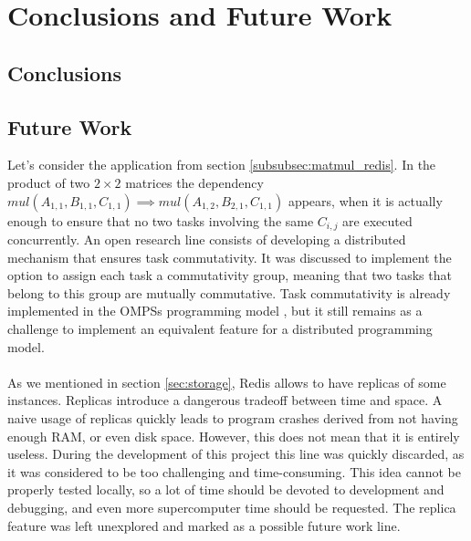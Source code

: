\section{Conclusions and Future Work}
\subsection{Conclusions}
\label{subsec:conclusions}


\subsection{Future Work}
\label{subsec:future_work}

Let's consider the application from section \ref{subsubsec:matmul_redis}. In the product of two $2 \times 2$ matrices the dependency $mul(A_{1, 1}, B_{1, 1}, C_{1, 1}) \implies mul(A_{1,2}, B_{2, 1}, C_{1, 1})$ appears, when it is actually enough to ensure that no two tasks involving the same $C_{i, j}$ are executed concurrently. An open research line consists of developing a distributed mechanism that ensures task commutativity. It was discussed to implement the option to assign each task a commutativity group, meaning that two tasks that belong to this group are mutually commutative. Task commutativity is already implemented in the OMPSs programming model \cite{duran2011ompss}, but it still remains as a challenge to implement an equivalent feature for a distributed programming model.\\
\\
As we mentioned in section \ref{sec:storage}, Redis allows to have replicas of some instances. Replicas introduce a dangerous tradeoff between time and space. A naive usage of replicas quickly leads to program crashes derived from not having enough RAM, or even disk space. However, this does not mean that it is entirely useless. During the development of this project this line was quickly discarded, as it was considered to be too challenging and time-consuming. This idea cannot be properly tested locally, so a lot of time should be devoted to development and debugging, and even more supercomputer time should be requested. The replica feature was left unexplored and marked as a possible future work line.